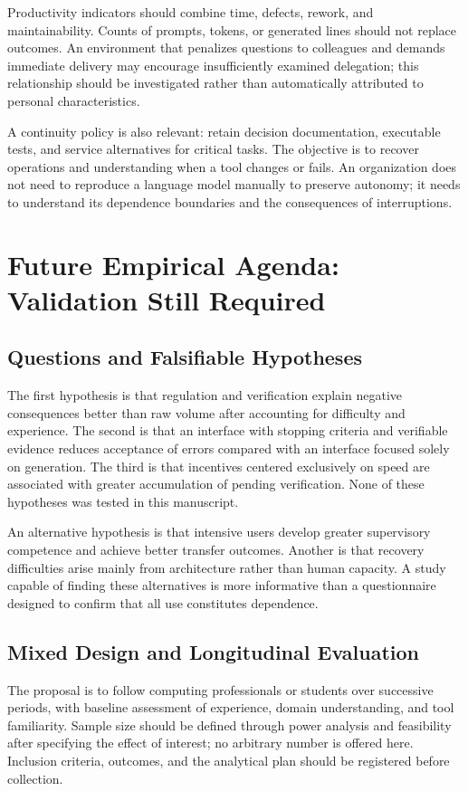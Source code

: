 \documentclass[11pt,a4paper]{article}
\begin{document}
Productivity indicators should combine time, defects, rework, and maintainability. Counts of prompts, tokens, or generated lines should not replace outcomes. An environment that penalizes questions to colleagues and demands immediate delivery may encourage insufficiently examined delegation; this relationship should be investigated rather than automatically attributed to personal characteristics.

A continuity policy is also relevant: retain decision documentation, executable tests, and service alternatives for critical tasks. The objective is to recover operations and understanding when a tool changes or fails. An organization does not need to reproduce a language model manually to preserve autonomy; it needs to understand its dependence boundaries and the consequences of interruptions.

\section{Future Empirical Agenda: Validation Still Required}
\subsection{Questions and Falsifiable Hypotheses}
The first hypothesis is that regulation and verification explain negative consequences better than raw volume after accounting for difficulty and experience. The second is that an interface with stopping criteria and verifiable evidence reduces acceptance of errors compared with an interface focused solely on generation. The third is that incentives centered exclusively on speed are associated with greater accumulation of pending verification. None of these hypotheses was tested in this manuscript.

An alternative hypothesis is that intensive users develop greater supervisory competence and achieve better transfer outcomes. Another is that recovery difficulties arise mainly from architecture rather than human capacity. A study capable of finding these alternatives is more informative than a questionnaire designed to confirm that all use constitutes dependence.

\subsection{Mixed Design and Longitudinal Evaluation}
The proposal is to follow computing professionals or students over successive periods, with baseline assessment of experience, domain understanding, and tool familiarity. Sample size should be defined through power analysis and feasibility after specifying the effect of interest; no arbitrary number is offered here. Inclusion criteria, outcomes, and the analytical plan should be registered before collection.
\end{document}
